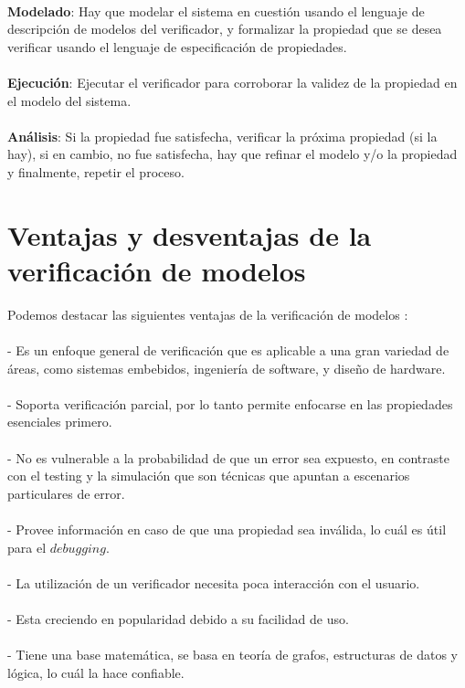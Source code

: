 \\
\textbf{Modelado}: Hay que modelar el sistema en cuestión usando el lenguaje de descripción de modelos del verificador, y formalizar la propiedad que se desea verificar usando el lenguaje de especificación de propiedades.\\
\\
\textbf{Ejecución}: Ejecutar el verificador para corroborar la validez de la propiedad en el modelo del sistema.\\
\\
\textbf{Análisis}: Si la propiedad fue satisfecha, verificar la próxima propiedad (si la hay), si en cambio, no fue satisfecha, hay que refinar el modelo y/o la propiedad y finalmente, repetir el proceso.\\

\section{Ventajas y desventajas de la verificación de modelos}
\noindent Podemos destacar las siguientes ventajas de la verificación de modelos \cite{Baier:2}:\\
\\
- Es un enfoque general de verificación que es aplicable a una gran variedad de áreas, como sistemas embebidos, ingeniería de software, y diseño de hardware.\\
\\
- Soporta verificación parcial, por lo tanto permite enfocarse en las propiedades esenciales primero.\\
\\
- No es vulnerable a la probabilidad de que un error sea expuesto, en contraste con el testing y la simulación que son técnicas que apuntan a escenarios particulares de error.\\
\\
- Provee información en caso de que una propiedad sea inválida, lo cuál es útil para el $debugging$.\\
\\
- La utilización de un verificador necesita poca interacción con el usuario.\\
\\
- Esta creciendo en popularidad debido a su facilidad de uso.\\
\\
- Tiene una base matemática, se basa en teoría de grafos, estructuras de datos y lógica, lo cuál la hace confiable.\\
\\
